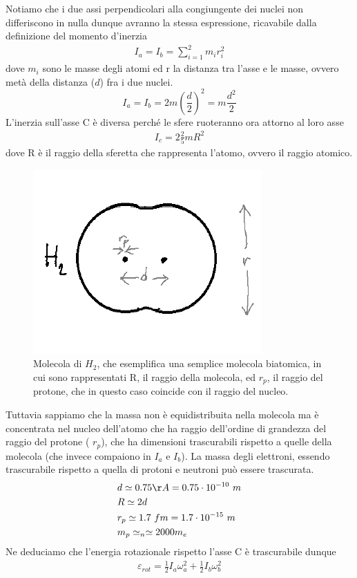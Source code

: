 \documentclass[10pt,a4paper]{article}
\begin{document}
\FloatBarrier
Notiamo che i due assi perpendicolari alla congiungente dei nuclei non differiscono in nulla dunque avranno la stessa espressione, ricavabile dalla definizione del momento d'inerzia
\begin{align*} 
I_a=I_b=\sum_{i=1}^{2}m_ir_i^2
\end{align*} 
dove \(m_i\) sono le masse degli atomi ed r la distanza tra l'asse e le masse, ovvero metà della distanza (\(d\)) fra i due nuclei. 
\[I_a=I_b=2 m \left(\frac{d}{2}\right)^2 = m\frac{d^2}{2}\]
L'inerzia sull'asse C è diversa perché le sfere ruoteranno ora attorno al loro asse
\begin{align*} 
	I_c = 2 \frac{2}{5}m R^2 
\end{align*} 
dove R è il raggio della sferetta che rappresenta l'atomo, ovvero il raggio atomico.
\begin{figure}[h!]
	\centering
	\includegraphics[width=0.4\linewidth]{../images/molecolaH2}
	\caption{Molecola di $H_2$, che esemplifica una semplice molecola biatomica, in cui sono rappresentati R, il raggio della molecola, ed $r_p$, il raggio del protone, che in questo caso coincide con il raggio del nucleo.}
	\label{fig:molecolah2}
\end{figure}
\FloatBarrier
Tuttavia sappiamo che la massa non è equidistribuita nella molecola ma è concentrata nel nucleo dell'atomo che ha raggio dell'ordine di grandezza del raggio del protone ( \(r_p\)), che ha dimensioni trascurabili rispetto a quelle della molecola (che invece compaiono in $I_a$ e $I_b$). La massa degli elettroni, essendo trascurabile rispetto a quella di protoni e neutroni può essere trascurata.
\begin{align*} 
	&d \simeq 0.75\AA = 0.75 \cdot 10^{-10}\ m\\
	&R \simeq 2d\\
	&r_p \simeq 1.7\ fm = 1.7\cdot 10^{-15}\ m\\
	&m_p\simeq_n \simeq 2000m_e
\end{align*} 
Ne deduciamo che l'energia rotazionale rispetto l'asse C è trascurabile dunque
\begin{align*} 
	\varepsilon_{rot} = \frac{1}{2 }I_a \omega_a^2 + \frac{1}{2 } I_b \omega_b^2
\end{align*} 
\end{document}
